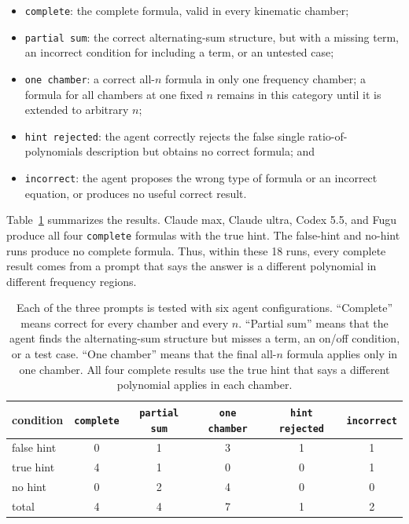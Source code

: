 \documentclass{article}
\newcommand{\outcome}[1]{\texttt{#1}}
\begin{document}
\begin{itemize}
    \item \outcome{complete}: the complete formula, valid in every kinematic
    chamber;
    \item \outcome{partial sum}: the correct alternating-sum structure, but
    with a missing term, an incorrect condition for including a term, or an
    untested case;
    \item \outcome{one chamber}: a correct all-$n$ formula in only one
    frequency chamber; a formula for all chambers at one fixed $n$ remains in
    this category until it is extended to arbitrary $n$;
    \item \outcome{hint rejected}: the agent correctly rejects the false single
    ratio-of-polynomials description but obtains no correct formula; and
    \item \outcome{incorrect}: the agent proposes the wrong type of formula or
    an incorrect equation, or produces no useful correct result.
\end{itemize}

Table~\ref{tab:outcome-counts} summarizes the results. Claude max, Claude
ultra, Codex 5.5, and Fugu produce all four \outcome{complete} formulas with
the true hint. The false-hint and no-hint runs produce no complete formula.
Thus, within these 18 runs, every complete result comes from a prompt that says
the answer is a different polynomial in different frequency regions.

\begin{table}[H]
\caption{Each of the three prompts is tested with six agent configurations.
``Complete'' means correct for every chamber and every $n$. ``Partial sum''
means that the agent finds the alternating-sum structure but misses a term,
an on/off condition, or a test case. ``One chamber'' means that the final
all-$n$ formula applies only in one chamber. All four complete results use the
true hint that says a different polynomial applies in each chamber.}
\label{tab:outcome-counts}
\centering
\small
\begin{tabular}{@{}lccccc@{}}
\toprule
condition & \outcome{complete} & \outcome{partial sum} & \outcome{one chamber} & \outcome{hint rejected} & \outcome{incorrect} \\
\midrule
false hint & 0 & 1 & 3 & 1 & 1 \\
true hint & 4 & 1 & 0 & 0 & 1 \\
no hint   & 0 & 2 & 4 & 0 & 0 \\
\midrule
total     & 4 & 4 & 7 & 1 & 2 \\
\bottomrule
\end{tabular}
\end{table}
\end{document}
